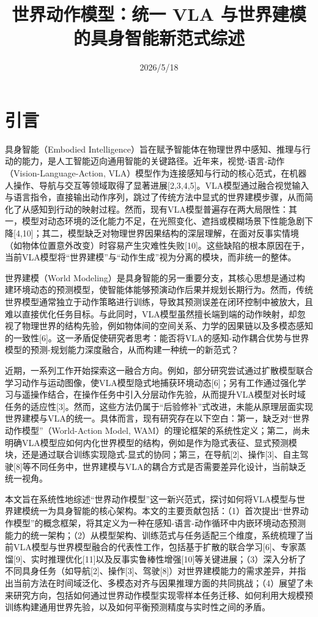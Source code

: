 \documentclass{article}
\title{世界动作模型：统一 VLA 与世界建模的具身智能新范式综述}
\date{2026/5/18}
\begin{document}
\maketitle

\section{引言}

具身智能（Embodied Intelligence）旨在赋予智能体在物理世界中感知、推理与行动的能力，是人工智能迈向通用智能的关键路径。近年来，视觉-语言-动作（Vision-Language-Action, VLA）模型作为连接感知与行动的核心范式，在机器人操作、导航与交互等领域取得了显著进展[2,3,4,5]。VLA模型通过融合视觉输入与语言指令，直接输出动作序列，跳过了传统方法中显式的世界建模步骤，从而简化了从感知到行动的映射过程。然而，现有VLA模型普遍存在两大局限性：其一，模型对动态环境的泛化能力不足，在光照变化、遮挡或模糊场景下性能急剧下降[4,10]；其二，模型缺乏对物理世界因果结构的深层理解，在面对反事实情境（如物体位置意外改变）时容易产生灾难性失败[10]。这些缺陷的根本原因在于，当前VLA模型将“世界建模”与“动作生成”视为分离的模块，而非统一的整体。

世界建模（World Modeling）是具身智能的另一重要分支，其核心思想是通过构建环境动态的预测模型，使智能体能够预演动作后果并规划长期行为。然而，传统世界模型通常独立于动作策略进行训练，导致其预测误差在闭环控制中被放大，且难以直接优化任务目标。与此同时，VLA模型虽然擅长端到端的动作映射，却忽视了物理世界的结构先验，例如物体间的空间关系、力学的因果链以及多模态感知的一致性[6]。这一矛盾促使研究者思考：能否将VLA的感知-动作耦合优势与世界模型的预测-规划能力深度融合，从而构建一种统一的新范式？

近期，一系列工作开始探索这一融合方向。例如，部分研究尝试通过扩散模型联合学习动作与运动图像，使VLA模型隐式地捕获环境动态[6]；另有工作通过强化学习与遥操作结合，在操作任务中引入分层动作先验，从而提升VLA模型对长时域任务的适应性[3]。然而，这些方法仍属于“后验修补”式改进，未能从原理层面实现世界建模与VLA的统一。具体而言，现有研究存在以下空白：第一，缺乏对“世界动作模型”（World-Action Model, WAM）的理论框架的系统性定义；第二，尚未明确VLA模型应如何内化世界模型的结构，例如是作为隐式表征、显式预测模块，还是通过联合训练实现隐式-显式的协同；第三，在导航[2]、操作[3]、自主驾驶[8]等不同任务中，世界建模与VLA的耦合方式是否需要差异化设计，当前缺乏统一视角。

本文旨在系统性地综述“世界动作模型”这一新兴范式，探讨如何将VLA模型与世界建模统一为具身智能的核心架构。本文的主要贡献包括：（1）首次提出“世界动作模型”的概念框架，将其定义为一种在感知-语言-动作循环中内嵌环境动态预测能力的统一架构；（2）从模型架构、训练范式与任务适配三个维度，系统梳理了当前VLA模型与世界模型融合的代表性工作，包括基于扩散的联合学习[6]、专家蒸馏[9]、实时推理优化[11]以及反事实鲁棒性增强[10]等关键进展；（3）深入分析了不同具身任务（如导航[2]、操作[3]、驾驶[8]）对世界建模能力的需求差异，并指出当前方法在时间域泛化、多模态对齐与因果推理方面的共同挑战；（4）展望了未来研究方向，包括如何通过世界动作模型实现零样本任务迁移、如何利用大规模预训练构建通用世界先验，以及如何平衡预测精度与实时性之间的矛盾。
\end{document}

